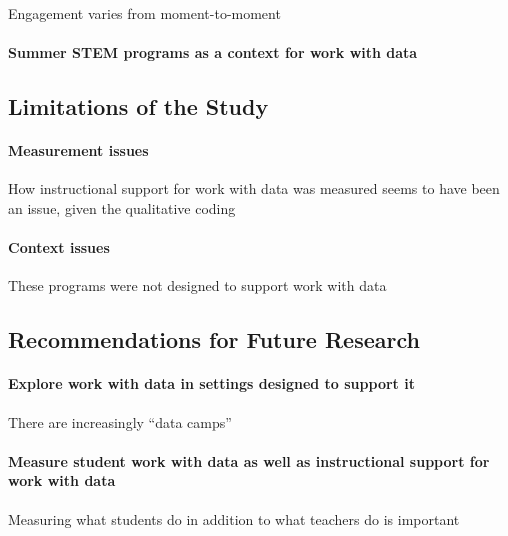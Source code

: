 \documentclass[]{book}
\let\oldparagraph\paragraph
\renewcommand{\paragraph}[1]{\oldparagraph{#1}\mbox{}}
\theoremstyle{definition}
\theoremstyle{definition}
\theoremstyle{definition}
\theoremstyle{remark}
\begin{document}
Engagement varies from moment-to-moment

\paragraph{Summer STEM programs as a context for work with
data}\label{summer-stem-programs-as-a-context-for-work-with-data}

\subsection{Limitations of the Study}\label{limitations-of-the-study}

\paragraph{Measurement issues}\label{measurement-issues}

How instructional support for work with data was measured seems to have
been an issue, given the qualitative coding

\paragraph{Context issues}\label{context-issues}

These programs were not designed to support work with data

\subsection{Recommendations for Future
Research}\label{recommendations-for-future-research}

\paragraph{Explore work with data in settings designed to support
it}\label{explore-work-with-data-in-settings-designed-to-support-it}

There are increasingly ``data camps''

\paragraph{Measure student work with data as well as instructional
support for work with
data}\label{measure-student-work-with-data-as-well-as-instructional-support-for-work-with-data}

Measuring what students do in addition to what teachers do is important
\end{document}
